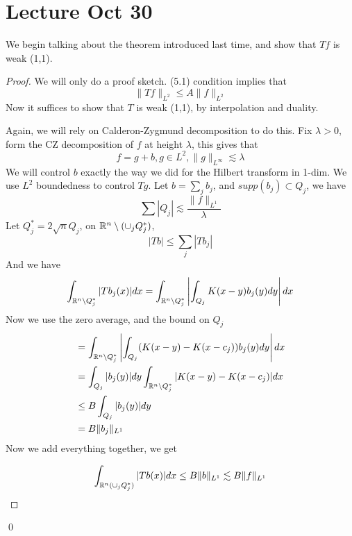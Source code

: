 \section{Lecture Oct 30}
We begin talking about the theorem introduced last time, and show that $Tf$ is weak (1,1).

\begin{proof}
    We will only do a proof sketch. (5.1) condition implies that
    \begin{equation*}
        \|Tf\|_{L^2}\leq A\|f\|_{L^2}
    \end{equation*}
    Now it suffices to show that $T$ is weak (1,1), by interpolation and duality.

    Again, we will rely on Calderon-Zygmund decomposition to do this. Fix $\lambda>0$, form the CZ decomposition of $f$ at height $\lambda$, this gives that
    \begin{equation*}
        f=g+b, g\in L^2, \|g\|_{L^\infty}\lesssim \lambda
    \end{equation*}
    We will control $b$ exactly the way we did for the Hilbert transform in 1-dim. We use $L^2$ boundedness to control $Tg$. Let $b=\sum_jb_j$, and $supp(b_j)\subset Q_j$, we have
    \begin{equation*}
        \sum|Q_j|\lesssim \frac{\|f\|_{L^1}}{\lambda}
    \end{equation*}
    Let $Q_j^*=2\sqrt{n}Q_j$, on $\mathbb{R}^n\setminus(\cup_jQ_j^*)$,
    \begin{equation*}
        |Tb|\leq\sum_j|Tb_j|
    \end{equation*}
    And we have
    \begin{equation*}
        \int_{\mathbb{R}^n\setminus Q_j^*}|Tb_j(x)|dx=\int_{\mathbb{R}^n\setminus Q_j^*}\left|\int_{Q_j}K(x-y)b_j(y)dy\right|dx
    \end{equation*}
    Now we use the zero average, and the bound on $Q_j$
    \begin{align*}
        &=\int_{\mathbb{R}^n\setminus Q_j^*}\left|\int_{Q_j}(K(x-y)-K(x-c_j))b_j(y)dy\right|dx\\
        &=\int_{Q_j}|b_j(y)|dy\int_{\mathbb{R}^n\setminus Q_j^*}|K(x-y)-K(x-c_j)|dx\\
        &\leq B\int_{Q_j}|b_j(y)|dy\\
        &=B\|b_j\|_{L^1}
    \end{align*}
    Now we add everything together, we get

    \begin{equation*}
        \int_{\mathbb{R}^n(\cup_j Q_j^*)}|Tb(x)|dx\leq B\|b\|_{L^1}\lesssim B\|f\|_{L^1}
    \end{equation*}
\end{proof}
\qed



